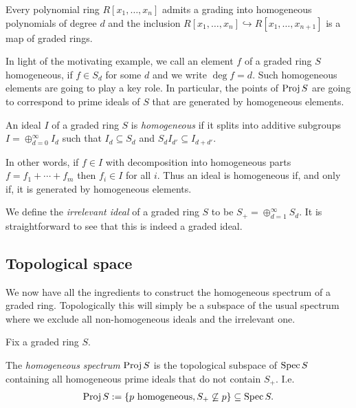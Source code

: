 \documentclass{article}
\begin{document}
\begin{example}
  Every polynomial ring $R[x_1,\ldots,x_n]$ admits a grading into
  homogeneous polynomials of degree $d$ and the inclusion
  $R[x_1,\ldots,x_n] \hookrightarrow R[x_1,\ldots,x_{n+1}]$
  is a map of graded rings.
\end{example}

In light of the motivating example, we call an element
$f$ of a graded ring $S$ homogeneous, if $f\in S_d$ for some $d$
and we write $\deg f = d$.
Such homogeneous elements are going to play a key role. In particular,
the points of $\operatorname{Proj} S$ are going to correspond to prime ideals of $S$
that are generated by homogeneous elements.

\begin{definition}
  An ideal $I$ of a graded ring $S$ is \emph{homogeneous} if it splits into
  additive subgroups $I=\oplus_{d=0}^\infty I_d$ such that
  $I_d\subseteq S_d$ and $S_d I_{d'} \subseteq I_{d+d'}$.
\end{definition}

In other words, if $f\in I$ with decomposition into homogeneous parts
$f=f_1+\cdots + f_m$ then $f_i\in I$ for all $i$. Thus an ideal is
homogeneous if, and only if, it is generated by homogeneous elements.
\cite{boer1961}

\begin{example}
  We define the \emph{irrelevant ideal} of a graded ring $S$
  to be $S_+ = \oplus_{d=1}^\infty S_d$. It is straightforward to
  see that this is indeed a graded ideal.
\end{example}

\subsection{Topological space}

We now have all the ingredients to construct the homogeneous spectrum
of a graded ring. Topologically this will simply be a subspace of
the usual spectrum where we exclude all non-homogeneous ideals and the irrelevant one.

Fix a graded ring $S$.

\begin{definition}
  The \emph{homogeneous spectrum} $\operatorname{Proj} S$
  is the topological subspace of $\operatorname{Spec} S$ containing all
  homogeneous prime ideals that do not contain $S_+$. I.e.
  \begin{align*}
    \operatorname{Proj} S := \left\lbrace{ \text{$p$ homogeneous}, S_+ \not\subseteq p }\right\rbrace \subseteq \operatorname{Spec} S.
  \end{align*}
\end{definition}
\end{document}
